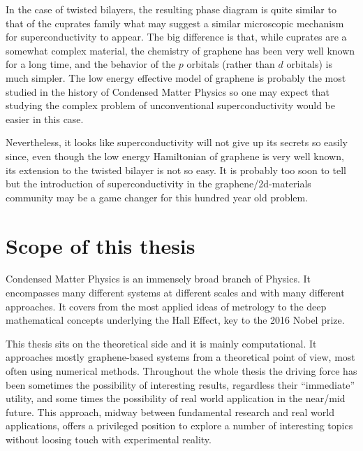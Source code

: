 In the case of twisted bilayers, the resulting phase diagram is quite similar to that of the cuprates family what may suggest a similar microscopic mechanism for superconductivity to appear. The big difference is that, while cuprates are a somewhat complex material, the chemistry of graphene has been very well known for a long time, and the behavior of the $p$ orbitals (rather than $d$ orbitals) is much simpler.
The low energy effective model of graphene is probably the most studied in the history of Condensed Matter Physics so one may expect that studying the complex problem of unconventional superconductivity would be easier in this case.

Nevertheless, it looks like superconductivity will not give up its secrets so easily since, even though the low energy Hamiltonian of graphene is very well known, its extension to the twisted bilayer is not so easy.
It is probably too soon to tell but the introduction of superconductivity in the graphene/2d-materials community may be a game changer for this hundred year old problem. %


\section{Scope of this thesis}
Condensed Matter Physics is an immensely broad branch of Physics. It encompasses many different systems at different scales and with many different approaches.
It covers from the most applied ideas of metrology to the deep mathematical concepts underlying the Hall Effect, key to the 2016 Nobel prize.

This thesis sits on the theoretical side and it is mainly computational.
It approaches mostly graphene-based systems from a theoretical point of view, most often using numerical methods.
Throughout the whole thesis the driving force has been sometimes the possibility of interesting results, regardless their ``immediate'' utility, and some times the possibility of real world application in the near/mid future.
This approach, midway between fundamental research and real world applications, offers a privileged position to explore a number of interesting topics without loosing touch with experimental reality.
\bigskip


